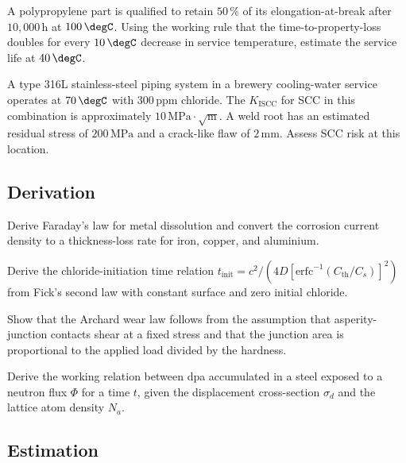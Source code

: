 \begin{exercise}
A polypropylene part is qualified to retain $50\,\%$ of its
elongation-at-break after $10{,}000\,\text{h}$ at $100\,\degC$. Using
the working rule that the time-to-property-loss doubles for every
$10\,\degC$ decrease in service temperature, estimate the service life
at $40\,\degC$.
\end{exercise}

\begin{exercise}
A type 316L stainless-steel piping system in a brewery cooling-water
service operates at $70\,\degC$ with $300\,\text{ppm}$ chloride. The
$K_{\text{ISCC}}$ for SCC in this combination is approximately
$10\,\text{MPa}\cdot\sqrt{\text{m}}$. A weld root has an estimated
residual stress of $200\,\text{MPa}$ and a crack-like flaw of
$2\,\text{mm}$. Assess SCC risk at this location.
\end{exercise}

\subsection*{Derivation}

\begin{exercise}
Derive Faraday's law for metal dissolution and convert the corrosion
current density to a thickness-loss rate for iron, copper, and
aluminium.
\end{exercise}

\begin{exercise}
Derive the chloride-initiation time relation $t_{\text{init}} = c^2 /
(4 D [\text{erfc}^{-1}(C_{\text{th}}/C_s)]^2)$ from Fick's second law
with constant surface and zero initial chloride.
\end{exercise}

\begin{exercise}
Show that the Archard wear law follows from the assumption that
asperity-junction contacts shear at a fixed stress and that the
junction area is proportional to the applied load divided by the
hardness.
\end{exercise}

\begin{exercise}
Derive the working relation between dpa accumulated in a steel
exposed to a neutron flux $\Phi$ for a time $t$, given the
displacement cross-section $\sigma_d$ and the lattice atom density
$N_a$.
\end{exercise}

\subsection*{Estimation}

